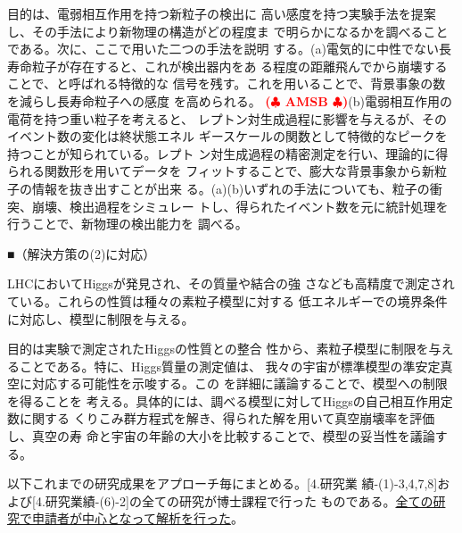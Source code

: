 \documentclass[11pt,a4paper,twoside,dvipdfmx]{jarticle}		%
\def\rem#1{ {\bf\textcolor{red}{($\clubsuit$ #1 $\clubsuit$)}}}
\newcommand{\研究課題名}{粒子加速器を用いた電弱相互作用を持つ新物理の探索}
\newcommand{\研究機関名}{東京大学}
\newcommand{\申請者氏名}{千草颯}
\newcommand{\研究代表者氏名}{\申請者氏名}
\newcommand{\研究期間の最終元号年度}{34}	%
\begin{document}
{\vspace*{1mm}

目的は、電弱相互作用を持つ新粒子の検出に
高い感度を持つ実験手法を提案し、その手法により新物理の構造がどの程度ま
で明らかになるかを調べることである。次に、ここで用いた二つの手法を説明
する。(a)電気的に中性でない長寿命粒子が存在すると、これが検出器内をあ
る程度の距離飛んでから崩壊することで、と呼ばれる特徴的な
信号を残す。これを用いることで、背景事象の数を減らし長寿命粒子への感度
を高められる。\rem{AMSB}(b)電弱相互作用の電荷を持つ重い粒子を考えると、
レプトン対生成過程に影響を与えるが、そのイベント数の変化は終状態エネル
ギースケールの関数として特徴的なピークを持つことが知られている。レプト
ン対生成過程の精密測定を行い、理論的に得られる関数形を用いてデータを
フィットすることで、膨大な背景事象から新粒子の情報を抜き出すことが出来
る。(a)(b)いずれの手法についても、粒子の衝突、崩壊、検出過程をシミュレー
トし、得られたイベント数を元に統計処理を行うことで、新物理の検出能力を
調べる。

\vspace*{1mm}

■（解決方策の(2)に対応）

\vspace*{1mm}

LHCにおいてHiggsが発見され、その質量や結合の強
さなども高精度で測定されている。これらの性質は種々の素粒子模型に対する
低エネルギーでの境界条件に対応し、模型に制限を与える。

\vspace*{1mm}

目的は実験で測定されたHiggsの性質との整合
性から、素粒子模型に制限を与えることである。特に、Higgs質量の測定値は、
我々の宇宙が標準模型の準安定真空に対応する可能性を示唆する。この
を詳細に議論することで、模型への制限を得ることを
考える。具体的には、調べる模型に対してHiggsの自己相互作用定数に関する
くりこみ群方程式を解き、得られた解を用いて真空崩壊率を評価し、真空の寿
命と宇宙の年齢の大小を比較することで、模型の妥当性を議論する。

\vspace*{1mm}


\vspace*{1mm}

以下これまでの研究成果をアプローチ毎にまとめる。[4.研究業
績-(1)-3,4,7,8]および[4.研究業績-(6)-2]の全ての研究が博士課程で行った
ものである。\ul{全ての研究で申請者が中心となって解析を行った}。

}
\end{document}

